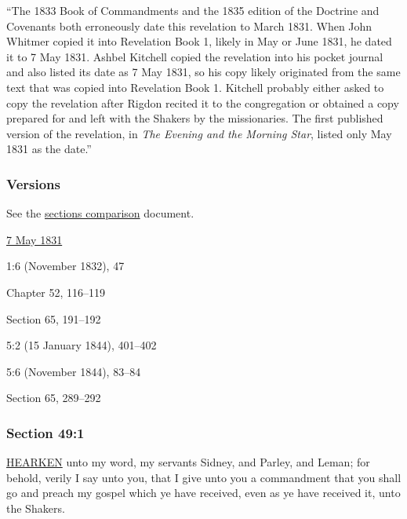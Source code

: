 			``The 1833 Book of Commandments and the 1835 edition of the Doctrine and Covenants both erroneously date this revelation to March 1831. When John Whitmer copied it into Revelation Book 1, likely in May or June 1831, he dated it to 7 May 1831. Ashbel Kitchell copied the revelation into his pocket journal and also listed its date as 7 May 1831, so his copy likely originated from the same text that was copied into Revelation Book 1. Kitchell probably either asked to copy the revelation after Rigdon recited it to the congregation or obtained a copy prepared for and left with the Shakers by the missionaries. The first published version of the revelation, in \textit{The Evening and the Morning Star}, listed only May 1831 as the date.''
		
	\subsubsection{Versions}
		\label{DC49-V}
		
		See the \href{https://drive.google.com/file/d/1goAvNz8jS4R8slYfMG_db55Ty2z_vmgK/view?usp=sharing}{sections comparison} document.
	
		\begin{compactdesc}
			\item[JSP] \hyperref[EMS-1831-JS-7-MAY-1831]{7 May 1831}
			\item[EMS] 1:6 (November 1832), 47
			\item[BC] Chapter 52, 116--119
			\item[DC 1835] Section 65, 191--192
			\item[TS] 5:2 (15 January 1844), 401--402
			\item[MS] 5:6 (November 1844), 83--84
			\item[DC 1844] Section 65, 289--292
		\end{compactdesc}

	\subsubsection{Section 49:1} %
		\label{DC49-1}

		\hyperref[HEARKEN]{HEARKEN} unto my word, my servants Sidney, and Parley, and Leman; for behold, verily I say unto you, that I give unto you a commandment that you shall go and preach my gospel which ye have received, even as ye have received it, unto the Shakers.



